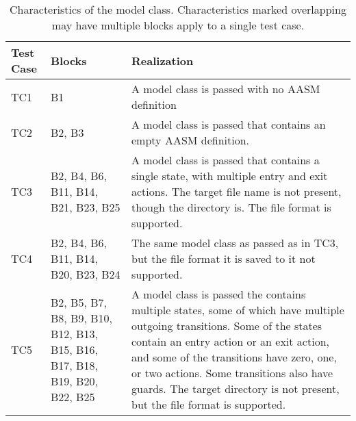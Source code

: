 \documentclass[document.tex]{subfiles}
\begin{document}
\begin{table}[!htbp]
  \centering
  \caption{Characteristics of the model class. Characteristics marked overlapping may have multiple blocks apply to a single test case.}
  \label{tbl:aasm-statecharts-cases}

  \renewcommand{\arraystretch}{1.2}
  \vspace{3mm}
  \begin{tabular}{l p{4cm} p{8cm}}
    \toprule
    Test Case & Blocks & Realization \\
    \midrule
    TC1 & B1 & A model class is passed with no AASM definition \\
    TC2 & B2, B3 & A model class is passed that contains an empty AASM definition. \\
    TC3 & B2, B4, B6, B11, B14, B21, B23, B25 & A model class is passed that contains a single state, with multiple entry and exit actions. The target file name is not present, though the directory is. The file format is supported. \\
    TC4 & B2, B4, B6, B11, B14, B20, B23, B24 & The same model class as passed as in TC3, but the file format it is saved to it not supported. \\
    TC5 & B2, B5, B7, B8, B9, B10, B12, B13, B15, B16, B17, B18, B19, B20, B22, B25 & A model class is passed the contains multiple states, some of which have multiple outgoing transitions. Some of the states contain an entry action or an exit action, and some of the transitions have zero, one, or two actions. Some transitions also have guards. The target directory is not present, but the file format is supported.
\\
    \bottomrule
  \end{tabular}
\end{table}


\FloatBarrier
\end{document}
